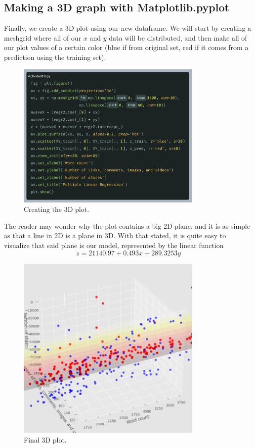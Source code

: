 \documentclass[10pt]{article}
\begin{document}
\subsection{Making a 3D graph with Matplotlib.pyplot}
Finally, we create a 3D plot using our new dataframe. We will start by creating a meshgrid where all of our $x$ and $y$ data will be distributed, and then make all of our plot values of a certain color (blue if from original set, red if it comes from a prediction using the training set). \par

\begin{figure}[h]
  \centering
  \includegraphics[width=90mm]{images/2025-03-25-11-39-30}
  \caption{Creating the 3D plot.}
\end{figure}

\newpage

The reader may wonder why the plot contains a big 2D plane, and it is as simple as that a line in 2D is a plane in 3D. With that stated, it is quite easy to visualize that said plane is our model, represented by the linear function
\begin{equation*}
  z = 21140.97 + 0.493x + 289.3253y
\end{equation*}

\begin{figure}[h]
  \centering
  \includegraphics[width=90mm]{images/2025-03-25-11-43-19}
  \caption{Final 3D plot.}
\end{figure}
\end{document}
